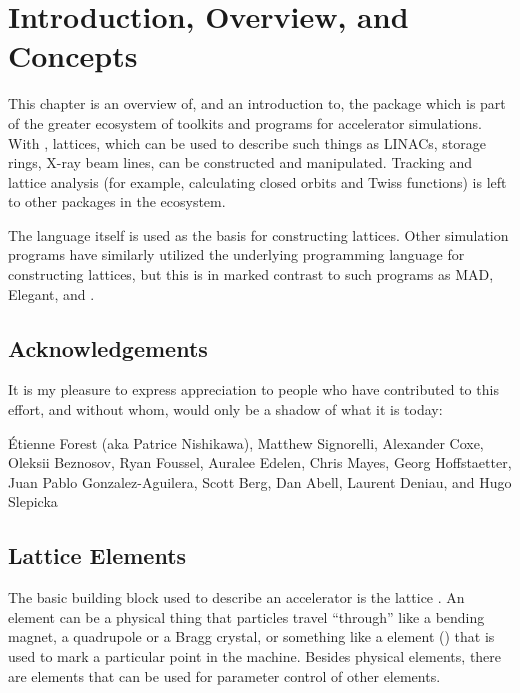 \chapter{Introduction, Overview, and Concepts}

This chapter is an overview of, and an introduction to, the \accellat package which is part of the
greater \bmadjl ecosystem of toolkits  and programs for accelerator simulations. With \accellat,
lattices, which can be used to describe such
things as LINACs, storage rings, X-ray beam lines,
can be constructed and manipulated. Tracking and lattice analysis (for example, calculating
closed orbits and Twiss functions) is left to other packages in the \bmadjl ecosystem.

The \julia language itself is used as the basis for constructing lattices. Other simulation programs
have similarly utilized the underlying programming language for constructing lattices\cite{merlin++,xsuite},
but this is in marked contrast to such programs as MAD\cite{mad}, Elegant\cite{elegant}, and
\bmad\cite{sagan:bmad2006}. 

\section{Acknowledgements}

It is my pleasure to express appreciation to people who have contributed to this effort, and without
whom, \bmadjl would only be a shadow of what it is today: 

\'Etienne Forest (aka Patrice Nishikawa),
Matthew Signorelli,
Alexander Coxe,
Oleksii Beznosov,
Ryan Foussel,
Auralee Edelen,
Chris Mayes,
Georg Hoffstaetter,
Juan Pablo Gonzalez-Aguilera,
Scott Berg,
Dan Abell,
Laurent Deniau, and
Hugo Slepicka

\section{Lattice Elements}
\label{s:element.def}

The basic building block used to describe an accelerator is the lattice . An
element can be a physical thing that particles travel ``through'' like a bending magnet, a
quadrupole or a Bragg crystal, or something like a  element () that is used
to mark a particular point in the machine.  Besides physical elements, there are 
elements that can be used for parameter control of other elements.


